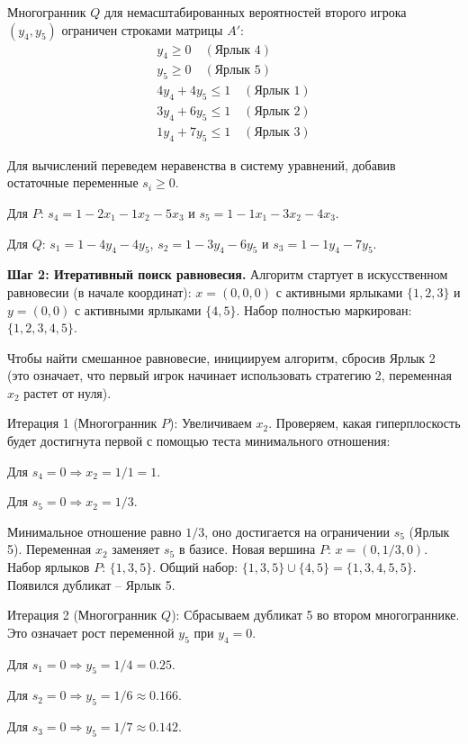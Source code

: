 Многогранник $Q$ для немасштабированных вероятностей второго игрока $(y_4, y_5)$ ограничен строками матрицы $A'$:
\begin{align}
    y_4 \ge 0 \quad (\text{Ярлык } 4) \\
    y_5 \ge 0 \quad (\text{Ярлык } 5) \\
    4y_4 + 4y_5 \le 1 \quad (\text{Ярлык } 1) \\
    3y_4 + 6y_5 \le 1 \quad (\text{Ярлык } 2) \\
    1y_4 + 7y_5 \le 1 \quad (\text{Ярлык } 3)
\end{align}

Для вычислений переведем неравенства в систему уравнений, добавив остаточные переменные $s_i \ge 0$.

Для $P$: $s_4 = 1 - 2x_1 - 1x_2 - 5x_3$ и $s_5 = 1 - 1x_1 - 3x_2 - 4x_3$.

Для $Q$: $s_1 = 1 - 4y_4 - 4y_5$, $s_2 = 1 - 3y_4 - 6y_5$ и $s_3 = 1 - 1y_4 - 7y_5$.

\textbf{Шаг 2: Итеративный поиск равновесия.}
Алгоритм стартует в искусственном равновесии (в начале координат): $x = (0,0,0)$ с активными ярлыками $\{1, 2, 3\}$ и $y = (0,0)$ с активными ярлыками $\{4, 5\}$. Набор полностью маркирован: $\{1, 2, 3, 4, 5\}$. 

Чтобы найти смешанное равновесие, инициируем алгоритм, сбросив Ярлык 2 (это означает, что первый игрок начинает использовать стратегию 2, переменная $x_2$ растет от нуля).

Итерация 1 (Многогранник $P$): Увеличиваем $x_2$. Проверяем, какая гиперплоскость будет достигнута первой с помощью теста минимального отношения:

Для $s_4 = 0 \Rightarrow x_2 = 1/1 = 1$.

Для $s_5 = 0 \Rightarrow x_2 = 1/3$.

Минимальное отношение равно $1/3$, оно достигается на ограничении $s_5$ (Ярлык 5). Переменная $x_2$ заменяет $s_5$ в базисе.
Новая вершина $P$: $x = (0, 1/3, 0)$. Набор ярлыков $P$: $\{1, 3, 5\}$.
Общий набор: $\{1, 3, 5\} \cup \{4, 5\} = \{1, 3, 4, 5, 5\}$. Появился дубликат – Ярлык 5.

Итерация 2 (Многогранник $Q$): Сбрасываем дубликат 5 во втором многограннике. Это означает рост переменной $y_5$ при $y_4=0$.

Для $s_1 = 0 \Rightarrow y_5 = 1/4 = 0.25$.

Для $s_2 = 0 \Rightarrow y_5 = 1/6 \approx 0.166$.

Для $s_3 = 0 \Rightarrow y_5 = 1/7 \approx 0.142$.

